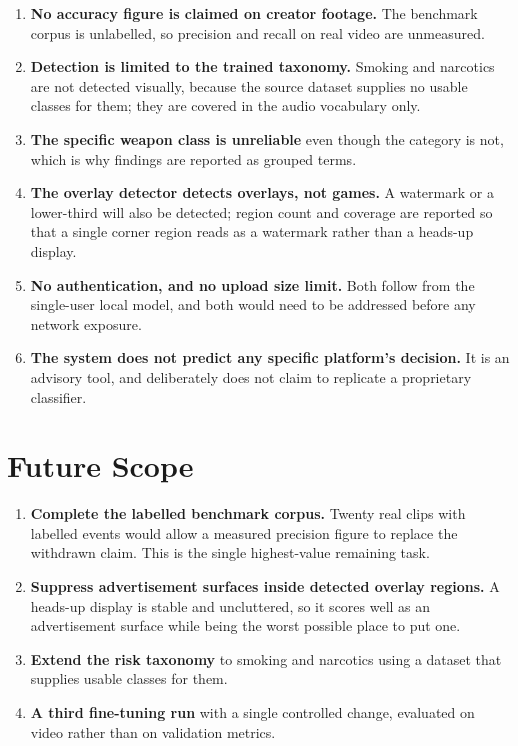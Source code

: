 \documentclass[
12pt,
a4paper,
oneside
]{report}
\begin{document}
\begin{enumerate}[itemsep=3pt]
\item \textbf{No accuracy figure is claimed on creator footage.} The benchmark
corpus is unlabelled, so precision and recall on real video are unmeasured.
\item \textbf{Detection is limited to the trained taxonomy.} Smoking and
narcotics are not detected visually, because the source dataset supplies no
usable classes for them; they are covered in the audio vocabulary only.
\item \textbf{The specific weapon class is unreliable} even though the category
is not, which is why findings are reported as grouped terms.
\item \textbf{The overlay detector detects overlays, not games.} A watermark or
a lower-third will also be detected; region count and coverage are reported so
that a single corner region reads as a watermark rather than a heads-up display.
\item \textbf{No authentication, and no upload size limit.} Both follow from the
single-user local model, and both would need to be addressed before any network
exposure.
\item \textbf{The system does not predict any specific platform's decision.} It
is an advisory tool, and deliberately does not claim to replicate a proprietary
classifier.
\end{enumerate}

\section{Future Scope}

\begin{enumerate}[itemsep=3pt]
\item \textbf{Complete the labelled benchmark corpus.} Twenty real clips with
labelled events would allow a measured precision figure to replace the withdrawn
claim. This is the single highest-value remaining task.
\item \textbf{Suppress advertisement surfaces inside detected overlay regions.}
A heads-up display is stable and uncluttered, so it scores well as an
advertisement surface while being the worst possible place to put one.
\item \textbf{Extend the risk taxonomy} to smoking and narcotics using a dataset
that supplies usable classes for them.
\item \textbf{A third fine-tuning run} with a single controlled change,
evaluated on video rather than on validation metrics.
\end{enumerate}
\end{document}
